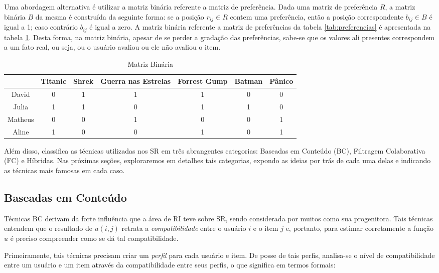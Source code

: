 Uma abordagem alternativa é utilizar a matriz binária referente a matriz de preferência. Dada uma matriz de preferência $R$, a matriz binária $B$ da mesma é construída da seguinte forma: se a posição $r_{ij} \in R$ contem uma preferência, então a posição correspondente $b_{ij} \in B$ é igual a 1; caso contrário $b_{ij}$ é igual a zero. A matriz binária referente a matriz de preferências da tabela \ref{tab:preferencias} é apresentada na tabela \ref{tab:binaria}. Desta forma, na matriz binária, apesar de se perder a gradação das preferências, sabe-se que os valores ali presentes correspondem a um fato real, ou seja, ou o usuário avaliou ou ele não avaliou o item.

\begin{table}
  \begin{tabular}{| c | c | c | c | c | c | c |}
    \hline
           & Titanic & Shrek & Guerra nas Estrelas & Forrest Gump & Batman & Pânico\\ \hline
    David  & 0 & 1 & 1 & 1 & 0 & 0\\ \hline
    Julia  & 1 & 1 & 0 & 1 & 1 & 0\\ \hline
    Matheus & 0 & 0 & 1 & 0 & 0 & 1\\ \hline
    Aline & 1 & 0 & 0 & 1 & 0 & 1\\
    \hline
  \end{tabular}
  \caption{Matriz Binária}
  \label{tab:binaria}
\end{table}

Além disso, \citep{Adomavicius:2005:TNG:1070611.1070751} classifica as técnicas utilizadas nos SR em três abrangentes categorias: Baseadas em Conteúdo (BC), Filtragem Colaborativa (FC) e Híbridas. Nas próximas seções, exploraremos em detalhes tais categorias, expondo as ideias por trás de cada uma delas e indicando as técnicas mais famosas em cada caso.  

\subsection{Baseadas em Conteúdo}
Técnicas BC derivam da forte influência que a área de RI teve sobre SR, sendo considerada por muitos como sua progenitora. Tais técnicas entendem que o resultado de $u(i,j)$ retrata a \textit{compatibilidade} entre o usuário $i$ e o item $j$ e, portanto, para estimar corretamente a função $u$ é preciso compreender como se dá tal compatibilidade.

Primeiramente, tais técnicas precisam criar um \textit{perfil} para cada usuário e item. De posse de tais perfis, analisa-se o nível de compatibilidade entre um usuário e um item através da compatibilidade entre seus perfis, o que significa em termos formais: 

